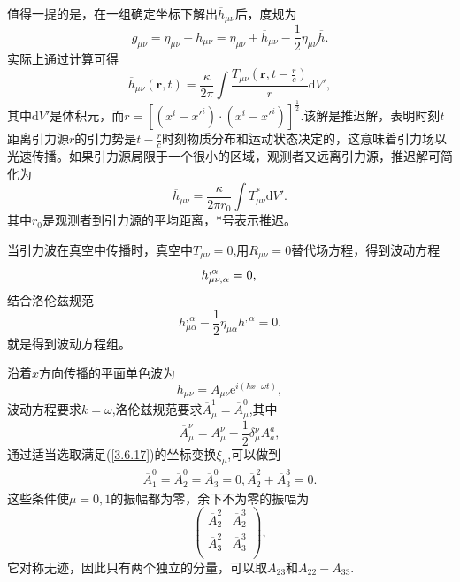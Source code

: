 \documentclass[11pt, a4paper, oneside, onecolumn]{ctexart}
\numberwithin{equation}{subsection}
\begin{document}
值得一提的是，在一组确定坐标下解出$\overline{h}_{\mu\nu}$后，度规为
\begin{equation}
g_{\mu\nu}=\eta_{\mu\nu}+h_{\mu\nu}=\eta_{\mu\nu}+\overline{h}_{\mu\nu}-\frac12\eta_{\mu\nu}\overline{h}.
\end{equation}
实际上通过计算可得
\begin{equation}
\overline{h}_{\mu\nu}\left(\boldsymbol{r},t\right)=\frac{\kappa}{2\pi}\int\frac{T_{\mu\nu}\left(\boldsymbol{r},t-\frac{r}{c}\right)}{r}\mathrm{d}V',
\end{equation}
其中$\mathrm{d}V'$是体积元，而$r=\left[\left(x^{i}-x'^{i}\right)\cdot\left(x^{i}-x'^{i}\right)\right]^{\frac12}$.该解是推迟解，表明时刻$t$距离引力源$r$的引力势是$t-\frac{r}{c}$时刻物质分布和运动状态决定的，这意味着引力场以光速传播。如果引力源局限于一个很小的区域，观测者又远离引力源，推迟解可简化为
\begin{equation}
\overline{h}_{\mu\nu}=\frac{\kappa}{2\pi r_{0}}\int T_{\mu\nu}^{*}\mathrm{d}V'.
\end{equation}
其中$r_{0}$是观测者到引力源的平均距离，*号表示推迟。

当引力波在真空中传播时，真空中$T_{\mu\nu}=0$,用$R_{\mu\nu}=0$替代场方程，得到波动方程
\begin{equation}
h^{,\alpha}_{\mu\nu,\alpha}=0,\\
\end{equation}
结合洛伦兹规范
\begin{equation}
h^{,\alpha}_{\mu\alpha}-\frac{1}{2}\eta_{\mu\alpha}h^{,\alpha}=0.
\end{equation}
就是得到波动方程组。

沿着$x$方向传播的平面单色波为
\begin{equation}
h_{\mu\nu}=A_{\mu\nu}\mathrm{e}^{i\left(kx\cdot\omega t\right)},
\end{equation}
波动方程要求$k=\omega$,洛伦兹规范要求$\overline{A}^{1}_{\mu}=\overline{A}^{0}_{\mu}$,其中
\begin{equation}
\overline{A}^{\nu}_{\mu}=A^{\nu}_{\mu}-\frac{1}{2}\delta{}^{\nu}_{\mu}A^{a}_{a},
\end{equation}
通过适当选取满足(\ref{3.6.17})的坐标变换$\xi_{\mu}$,可以做到
\begin{align}
\overline{A}^{0}_{1}=\overline{A}^{0}_{2}=\overline{A}^{0}_{3}=0,\overline{A}^{2}_{2}+\overline{A}^{3}_{3}=0.
\end{align}
这些条件使$\mu=0,1$的振幅都为零，余下不为零的振幅为
\begin{equation}
\begin{pmatrix}
\overline{A}^{2}_{2} & \overline{A}^{3}_{2}\\
\overline{A}^{2}_{3} & \overline{A}^{3}_{3}\\
\end{pmatrix},
\end{equation}
它对称无迹，因此只有两个独立的分量，可以取$A_{23}$和$A_{22}-A_{33}$.
\end{document}
